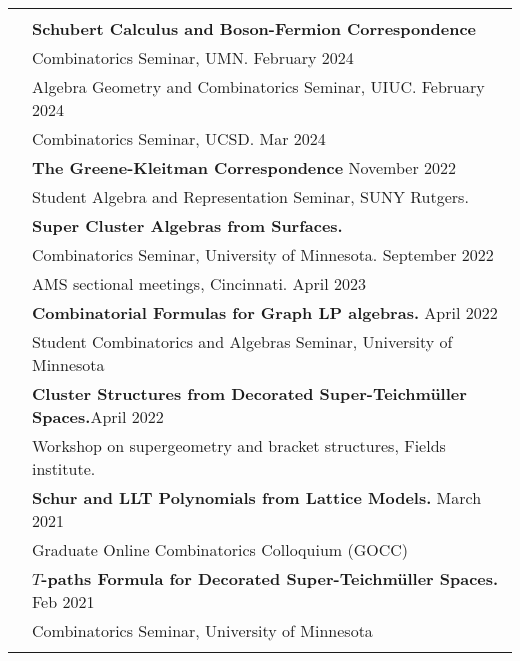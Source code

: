 \documentclass[letterpaper, 11pt,times]{article}
\newcommand{\mycolor}[0]{\color{RoyalBlue}}
\newlength{\myl}
\newcommand{\ind}[0]{\hspace{\myl}}
\newlength{\newl}
\newcommand{\paper}[2]{
\settowidth{\newl}{\textbf{#1. \ }}
\noindent
\hspace{\dimexpr\myl - \newl}
\textbf{#1. #2}
}
\begin{document}
\begin{longtable}{p{1in}p{5in}}




&\\

{\mycolor{Invited Talks}} 
& \textbf{Schubert Calculus and Boson-Fermion Correspondence}  \\
&\ind  Combinatorics Seminar, UMN. \hfill February 2024\\
&\ind  Algebra Geometry and Combinatorics Seminar, UIUC. \hfill February 2024\\
&\ind  Combinatorics Seminar, UCSD. \hfill Mar 2024\\

& \textbf{The Greene-Kleitman Correspondence} \hfill November 2022 \\
&\ind  Student Algebra and Representation Seminar, SUNY Rutgers. \\
& \textbf{Super Cluster Algebras from Surfaces.}\\
&\ind  Combinatorics Seminar, University of Minnesota.  \hfill September 2022 \\
&\ind  AMS sectional meetings, Cincinnati.  \hfill April 2023 \\
& \textbf{Combinatorial Formulas for Graph LP algebras.} \hfill April 2022 \\
&\ind  Student Combinatorics and Algebras Seminar, University of Minnesota\\
& \textbf{Cluster Structures from Decorated Super-Teichm\"uller Spaces.}\hfill April 2022\\
&\ind Workshop on supergeometry and bracket structures, Fields institute.\\

& \textbf{Schur and LLT Polynomials from Lattice Models.} \hfill March 2021 \\
&\ind  Graduate Online Combinatorics Colloquium (GOCC) \\
& \textbf{$T$-paths Formula for Decorated Super-Teichm\"uller Spaces.} \hfill Feb 2021 \\
&\ind  Combinatorics Seminar, University of Minnesota \\

& \\


\end{longtable}
\end{document}

